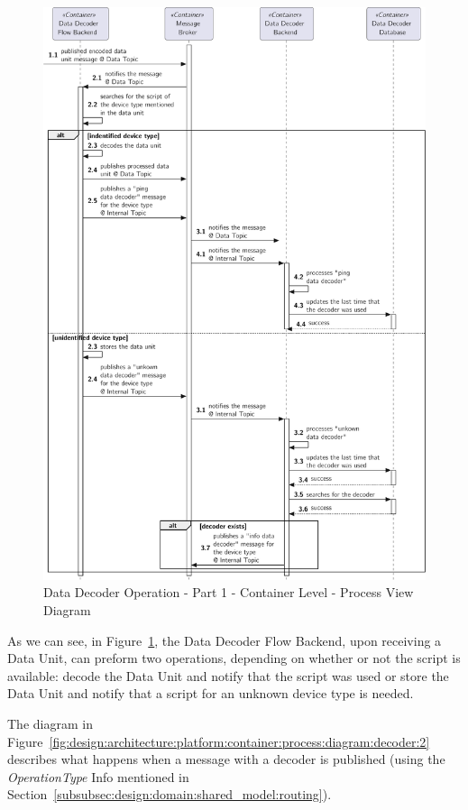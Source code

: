 \begin{figure}
   \centering
   \includegraphics[page=1,width=0.8\columnwidth]{assets/diagrams/design/architectural/level2/process/data-decoder-flow-1.pdf}
   \caption[Data Decoder Operation - Part 1 - Container Level - Process View Diagram]{Data Decoder Operation - Part 1 - Container Level - Process View Diagram}
   \label{fig:design:architecture:platform:container:process:diagram:decoder:1}
\end{figure}

As we can see, in Figure~\ref{fig:design:architecture:platform:container:process:diagram:decoder:1}, the Data Decoder Flow Backend, upon receiving a Data Unit, can preform two operations, depending on whether or not the script is available: decode the Data Unit and notify that the script was used or store the Data Unit and notify that a script for an unknown device type is needed.

The diagram in Figure~\ref{fig:design:architecture:platform:container:process:diagram:decoder:2} describes what happens when a message with a decoder is published (using the \textit{OperationType} Info mentioned in Section~\ref{subsubsec:design:domain:shared_model:routing}).

